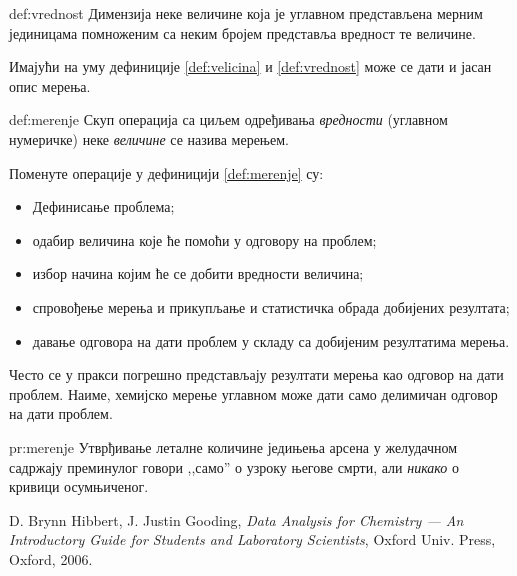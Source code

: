 \begin{df}[Вредност]{def:vrednost}
  Димензија неке величине која је углавном представљена мерним јединицама
  помноженим са неким бројем представља вредност те величине.
\end{df}

Имајући на уму дефиниције \ref{def:velicina} и \ref{def:vrednost} може
се дати и јасан опис мерења.

\begin{df}[Мерење]{def:merenje}
  Скуп операција са циљем одређивања \emph{вредности} (углавном
  нумеричке) неке \emph{величине} се назива мерењем.
\end{df}
Поменуте операције у дефиницији \ref{def:merenje} су:
\begin{itemize}[label={$\RHD$}]
\item Дефинисање проблема;
\item одабир величина које ће помоћи у одговору на проблем;
\item избор начина којим ће се добити вредности величина;
\item спровођење мерења и прикупљање и статистичка обрада
добијених резултата;
\item давање одговора на дати проблем у складу са добијеним
резултатима мерења.
\end{itemize}

Често се у пракси погрешно представљају резултати мерења као одговор
на дати проблем. Наиме, хемијско мерење углавном може дати само делимичан
одговор на дати проблем.
\begin{pr}[]{pr:merenje}
  Утврђивање леталне количине једињења арсена у желудачном садржају
  преминулог говори ,,само'' о узроку његове смрти, али \emph{никако}
  о кривици осумњиченог.
\end{pr}

\begin{thebibliography}{9}
 D. Brynn Hibbert, J. Justin Gooding, \textit{Data Analysis
  for Chemistry --- An Introductory Guide for Students and Laboratory
  Scientists\/}, Oxford Univ. Press, Oxford, 2006.
\end{thebibliography}
